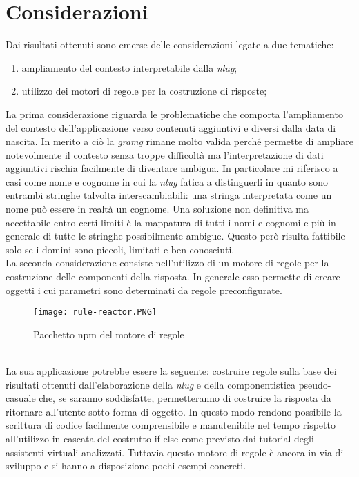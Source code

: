 \section{Considerazioni}
Dai risultati ottenuti sono emerse delle considerazioni legate a due tematiche:
\begin{enumerate}
	\item ampliamento del contesto interpretabile dalla \emph{\gls{nlug}};
	\item utilizzo dei motori di regole per la costruzione di risposte; 
\end{enumerate}
La prima considerazione riguarda le problematiche che comporta l'ampliamento del contesto dell'applicazione verso contenuti aggiuntivi e diversi dalla data di nascita. In merito a ciò la \emph{\gls{gramg}} rimane molto valida perché permette di ampliare notevolmente il contesto senza troppe difficoltà ma l'interpretazione di dati aggiuntivi rischia facilmente di diventare ambigua. In particolare mi riferisco a casi come nome e cognome in cui la \emph{\gls{nlug}} fatica a distinguerli in quanto sono entrambi stringhe talvolta interscambiabili: una stringa interpretata come un nome può essere in realtà un cognome. Una soluzione non definitiva ma accettabile entro certi limiti è la mappatura di tutti i nomi e cognomi e più in generale di tutte le stringhe possibilmente ambigue. Questo però risulta fattibile solo se i domini sono piccoli, limitati e ben conosciuti. \\
La seconda considerazione consiste nell'utilizzo di un motore di regole per la costruzione delle componenti della risposta. In generale esso permette di creare oggetti i cui parametri sono determinati da regole preconfigurate. \\
\begin{figure}[htbp]
	\begin{center}
		\texttt{[image: rule-reactor.PNG]}
		\caption{Pacchetto npm del motore di regole}
	\end{center}
\end{figure}
\\
La sua applicazione potrebbe essere la seguente: costruire regole sulla base dei risultati ottenuti dall'elaborazione della \emph{\gls{nlug}} e della componentistica pseudo-casuale che, se saranno soddisfatte, permetteranno di costruire la risposta da ritornare all'utente sotto forma di oggetto. In questo modo rendono possibile la scrittura di codice facilmente comprensibile e manutenibile nel tempo rispetto all'utilizzo in cascata del costrutto if-else come previsto dai tutorial degli assistenti virtuali analizzati. Tuttavia questo motore di regole è ancora in via di sviluppo e si hanno a disposizione pochi esempi concreti.